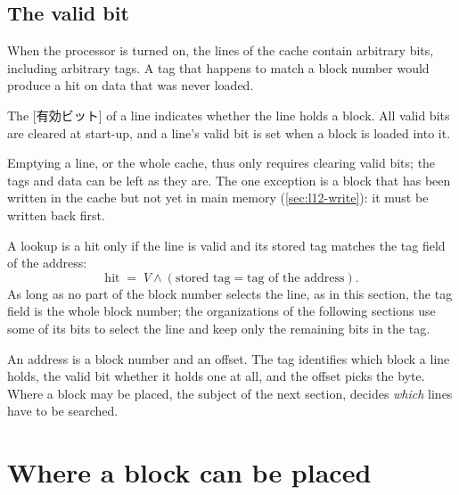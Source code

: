 \documentclass[../main.tex]{subfiles}
\begin{document}
\subsection{The valid bit}

When the processor is turned on, the lines of the cache contain arbitrary
bits, including arbitrary tags.  A tag that happens to match a block number
would produce a hit on data that was never loaded.

\begin{definition}
  The [有効ビット] of a line indicates whether the line holds
  a block.  All valid bits are cleared at start-up, and a line's valid bit is
  set when a block is loaded into it.
\end{definition}

Emptying a line, or the whole cache, thus only requires clearing valid bits;
the tags and data can be left as they are.  The one exception is a block
that has been written in the cache but not yet in main memory
(\cref{sec:l12-write}): it must be written back first.

A lookup is a hit only if the line is valid and its stored tag matches the
tag field of the address:
\begin{equation}
  \text{hit} \;=\; V \wedge (\text{stored tag} = \text{tag of the address}) .
  \label{eq:l12-hit}
\end{equation}
As long as no part of the block number selects the line, as in this section,
the tag field is the whole block number; the organizations of the following
sections use some of its bits to select the line and keep only the remaining
bits in the tag.

\begin{keypoint}
  An address is a block number and an offset.  The tag identifies which
  block a line holds, the valid bit whether it holds one at all, and the
  offset picks the byte.  Where a block may be placed, the subject of the
  next section, decides \emph{which} lines have to be searched.
\end{keypoint}

\section{Where a block can be placed}
\label{sec:l12-placement}
\end{document}
